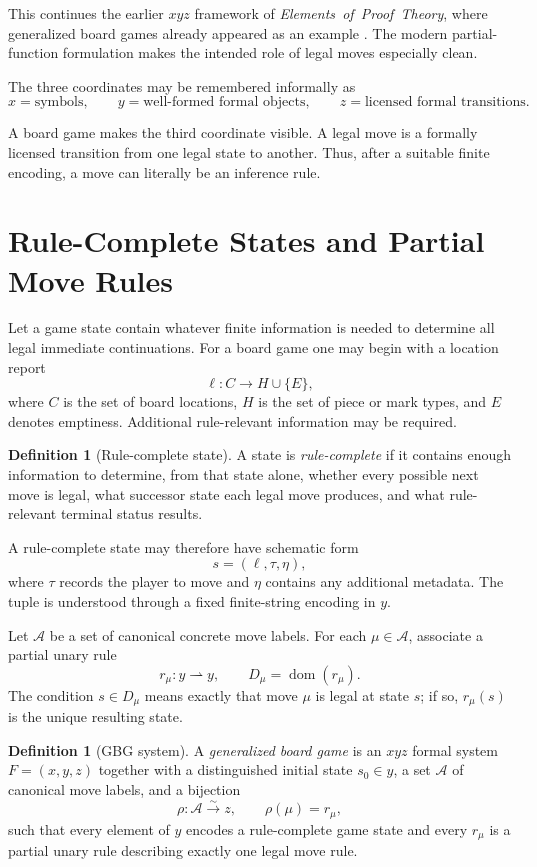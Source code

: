 \documentclass[11pt]{article}
\theoremstyle{definition}
\newtheorem{definition}[theorem]{Definition}
\theoremstyle{remark}
\newcommand{\dom}{\operatorname{dom}}
\newcommand{\EPT}{\mbox{\emph{Elements of Proof Theory}}}
\begin{document}
This continues the earlier $xyz$ framework of \EPT{}, where generalized board games already appeared as an example \cite{Tenneson2023}. The modern partial-function formulation makes the intended role of legal moves especially clean.

The three coordinates may be remembered informally as
\[
\boxed{x=\text{symbols}},
\qquad
\boxed{y=\text{well-formed formal objects}},
\qquad
\boxed{z=\text{licensed formal transitions}}.
\]

A board game makes the third coordinate visible. A legal move is a formally licensed transition from one legal state to another. Thus, after a suitable finite encoding, a move can literally be an inference rule.

\section{Rule-Complete States and Partial Move Rules}

Let a game state contain whatever finite information is needed to determine all legal immediate continuations. For a board game one may begin with a location report
\[
\ell:C\longrightarrow H\cup\{E\},
\]
where $C$ is the set of board locations, $H$ is the set of piece or mark types, and $E$ denotes emptiness. Additional rule-relevant information may be required.

\begin{definition}[Rule-complete state]
A state is \emph{rule-complete} if it contains enough information to determine, from that state alone, whether every possible next move is legal, what successor state each legal move produces, and what rule-relevant terminal status results.
\end{definition}

A rule-complete state may therefore have schematic form
\[
s=(\ell,\tau,\eta),
\]
where $\tau$ records the player to move and $\eta$ contains any additional metadata. The tuple is understood through a fixed finite-string encoding in $y$.

Let $\mathcal A$ be a set of canonical concrete move labels. For each $\mu\in\mathcal A$, associate a partial unary rule
\[
r_\mu:y\rightharpoonup y,
\qquad
D_\mu=\dom(r_\mu).
\]
The condition $s\in D_\mu$ means exactly that move $\mu$ is legal at state $s$; if so, $r_\mu(s)$ is the unique resulting state.

\begin{definition}[GBG system]
A \emph{generalized board game} is an $xyz$ formal system $F=(x,y,z)$ together with a distinguished initial state $s_0\in y$, a set $\mathcal A$ of canonical move labels, and a bijection
\[
\rho:\mathcal A\xrightarrow{\sim}z,
\qquad
\rho(\mu)=r_\mu,
\]
such that every element of $y$ encodes a rule-complete game state and every $r_\mu$ is a partial unary rule describing exactly one legal move rule.
\end{definition}
\end{document}
